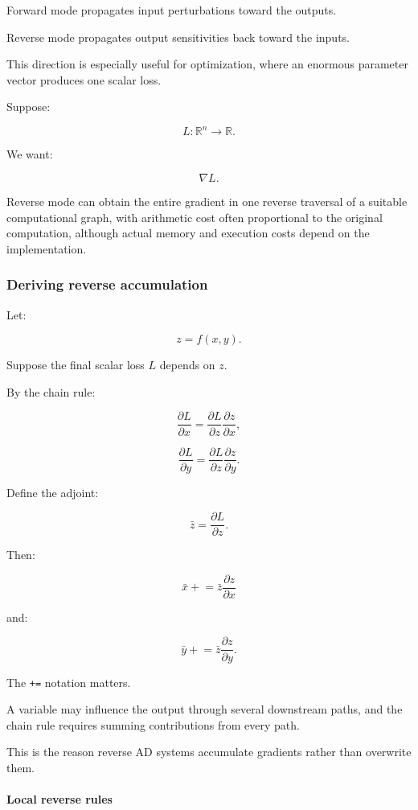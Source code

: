 Forward mode propagates input perturbations toward the outputs.

Reverse mode propagates output sensitivities back toward the inputs.

This direction is especially useful for optimization, where an enormous parameter vector produces one scalar loss.

Suppose:

\[
L:\mathbb R^n\rightarrow\mathbb R.
\]

We want:

\[
\nabla L.
\]

Reverse mode can obtain the entire gradient in one reverse traversal of a suitable computational graph, with arithmetic cost often proportional to the original computation, although actual memory and execution costs depend on the implementation.

\subsubsection{Deriving reverse accumulation}\label{02-foundations-ii-ch022-deriving-reverse-accumulation}

Let:

\[
z=f(x,y).
\]

Suppose the final scalar loss \(L\) depends on \(z\).

By the chain rule:

\[
\frac{\partial L}{\partial x} = \frac{\partial L}{\partial z} \frac{\partial z}{\partial x},
\]

\[
\frac{\partial L}{\partial y} = \frac{\partial L}{\partial z} \frac{\partial z}{\partial y}.
\]

Define the adjoint:

\[
\bar z=\frac{\partial L}{\partial z}.
\]

Then:

\[
\boxed{ \bar x\mathrel{+}= \bar z\frac{\partial z}{\partial x} }
\]

and:

\[
\boxed{ \bar y\mathrel{+}= \bar z\frac{\partial z}{\partial y} }.
\]

The \texttt{+=} notation matters.

A variable may influence the output through several downstream paths, and the chain rule requires summing contributions from every path.

This is the reason reverse AD systems accumulate gradients rather than overwrite them.

\paragraph{Local reverse rules}\label{02-foundations-ii-ch022-local-reverse-rules}

